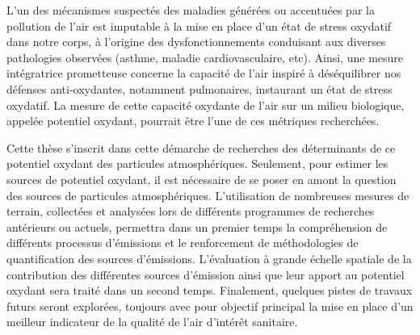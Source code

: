 L'un des mécanismes suspectés des maladies générées ou accentuées par la pollution de l'air
est imputable à la mise en place d'un état de stress oxydatif dans notre corps, à l'origine des
dysfonctionnements conduisant aux diverses pathologies observées (asthme, maladie
cardiovasculaire, etc). Ainsi, une mesure intégratrice prometteuse concerne la capacité de
l'air inspiré à déséquilibrer nos défenses anti-oxydantes, notamment pulmonaires, instaurant un état de stress oxydatif.
La mesure de cette capacité oxydante de l'air sur un milieu biologique, appelée potentiel oxydant, pourrait être
l'une de ces métriques recherchées.

Cette thèse s'inscrit dans cette démarche de recherches des déterminants de ce potentiel
oxydant des particules atmosphériques. Seulement, pour estimer les sources de potentiel
oxydant, il est nécessaire de se poser en amont la question des sources de particules
atmosphériques. L'utilisation de nombreuses mesures de terrain, collectées et analysées
lors de différents programmes de recherches antérieurs ou actuels, permettra dans un
premier temps la compréhension de différents processus d'émissions et le renforcement de
méthodologies de quantification des sources d'émissions. L'évaluation à grande échelle
spatiale de la contribution des différentes sources d'émission ainsi que leur apport au
potentiel oxydant sera traité dans un second temps. Finalement, quelques pistes de
travaux futurs seront explorées, toujours avec pour objectif principal la mise en place
d'un meilleur indicateur de la qualité de l'air d'intérêt sanitaire.


